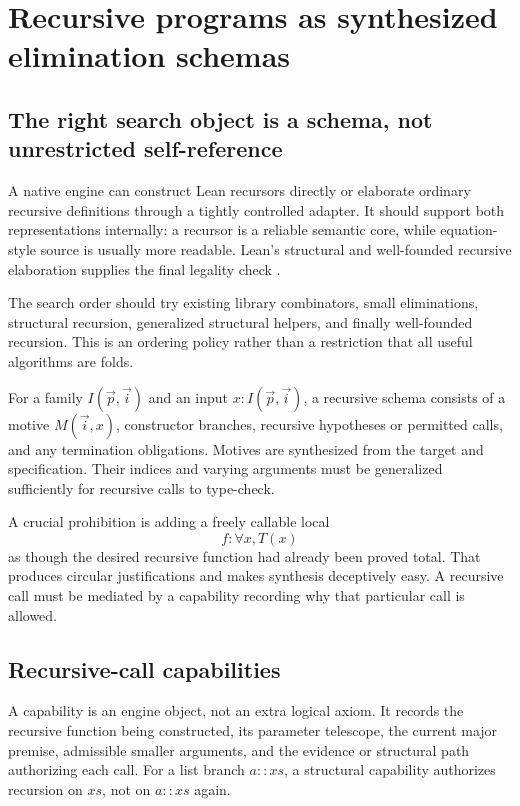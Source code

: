 \section{Recursive programs as synthesized elimination schemas}
\label{sec:recursion}

\subsection{The right search object is a schema, not unrestricted self-reference}

A native engine can construct Lean recursors directly or elaborate ordinary recursive definitions through a tightly controlled adapter. It should support both representations internally: a recursor is a reliable semantic core, while equation-style source is usually more readable. Lean's structural and well-founded recursive elaboration supplies the final legality check \cite{lean-recursion}.

The search order should try existing library combinators, small eliminations, structural recursion, generalized structural helpers, and finally well-founded recursion. This is an ordering policy rather than a restriction that all useful algorithms are folds.

For a family $I(\vec p,\vec i)$ and an input $x:I(\vec p,\vec i)$, a recursive schema consists of a motive $M(\vec i,x)$, constructor branches, recursive hypotheses or permitted calls, and any termination obligations. Motives are synthesized from the target and specification. Their indices and varying arguments must be generalized sufficiently for recursive calls to type-check.

A crucial prohibition is adding a freely callable local
\[
 f:\forall x, T(x)
\]
as though the desired recursive function had already been proved total. That produces circular justifications and makes synthesis deceptively easy. A recursive call must be mediated by a capability recording why that particular call is allowed.

\subsection{Recursive-call capabilities}

A capability is an engine object, not an extra logical axiom. It records the recursive function being constructed, its parameter telescope, the current major premise, admissible smaller arguments, and the evidence or structural path authorizing each call. For a list branch $a::xs$, a structural capability authorizes recursion on $xs$, not on $a::xs$ again.

